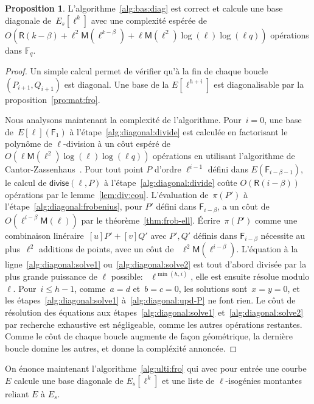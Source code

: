 \documentclass[10pt,a4paper]{book}
\theoremstyle{plain}
\theoremstyle{definition}
\theoremstyle{definition}
\theoremstyle{definition}
\newtheorem{prop}[thm]{Proposition}
\theoremstyle{definition}
\theoremstyle{remark}
\theoremstyle{remark}
\theoremstyle{definition}
\begin{document}
\begin{prop}\label{pro:alg:diagonal}
L'algorithme~\ref{alg:bas:diag} est correct et calcule une base diagonale 
de~$E_s[\ell^k]$ avec une complexité espérée de
$O(\mathsf{R}(k-\beta) + \ell^2\mathsf{M}(\ell^{k-\beta}) + \ell\mathsf{M}(\ell^2)\log(\ell)\log(\ell q))$ 
opérations dans $\mathbb{F}_q$.
\end{prop}

\begin{proof}
Un simple calcul permet de vérifier qu'à la fin de chaque boucle
$(P_{i+1},Q_{i+1})$ est diagonal. Une base de la $E[\ell^{h+i}]$ est 
diagonalisable par la proposition~\ref{pro:mat:fro}.

Nous analysons maintenant la complexité de l'algorithme.
Pour~$i = 0$, une base de~$E[\ell](\mathsf{F}_1)$ à l'étape~\ref{alg:diagonal:divide}
est calculée en factorisant le polynôme de $\ell$-division
à un côut espéré de $O(\ell\mathsf{M}(\ell^2)\log(\ell)\log(\ell q))$
opérations en utilisant l'algorithme de Cantor-Zassenhaus~\cite[Chapter 14.5]{vzGJG03}.
  Pour tout point $P$ d'ordre $\ell^{i-1}$ défini dans $E(\mathsf{F}_{i-\beta-1})$, 
  le calcul de $\mathsf{divise}(\ell, P)$ à l'étape~\ref{alg:diagonal:divide}
  coûte $O(\mathsf{R}(i-\beta))$ opérations par le lemme~\ref{lem:div:cou}.
  L'évaluation de~$\pi(P')$ à l'étape~\ref{alg:diagonal:frobenius}, pour $P'$ 
  défini dans $\mathsf{F}_{i-\beta}$, a un côut
  de~$O(\ell^{i-\beta}\mathsf{M}(\ell))$ par le théorème~\ref{thm:frob-ell}.
  \'Ecrire~$\pi(P')$ comme une combinaison linéraire~$[u] P' + [v] Q'$ avec 
  $P',Q'$ définis dans $\mathsf{F}_{i-\beta}$ nécessite au
  plus~$\ell^2$ additions de points, avec un côut de ~$\ell^2
  \mathsf{M}(\ell^{i-\beta})$.
L'équation à la ligne~\ref{alg:diagonal:solve1} ou~\ref{alg:diagonal:solve2}
est tout d'abord divisée par la plus grande puissance de $\ell$ possible:
~$\ell^{\min (h, i)}$, elle est ensuite résolue modulo $\ell$.
Pour~$i \leqslant h-1$, comme~$a = d$ et~$b = c = 0$, les solutions sont~$x = y
 = 0$, et les étapes~\ref{alg:diagonal:solve1} à~\ref{alg:diagonal:upd-P} ne 
font rien.
  Le côut de résolution des équations aux étapes~\ref{alg:diagonal:solve1}
  et~\ref{alg:diagonal:solve2} par recherche exhaustive est négligeable, comme
  les autres opérations restantes. Comme le côut de chaque boucle augmente
  de façon géométrique, la dernière boucle domine les autres, et donne la
  compléxité annoncée.
\end{proof}

On énonce maintenant l'algorithme~\ref{alg:ulti:fro} qui avec pour entrée une 
courbe $E$ calcule une base diagonale de $E_s[\ell^k]$ et une liste de 
$\ell$-isogénies montantes reliant $E$ à $E_s$.
\end{document}
